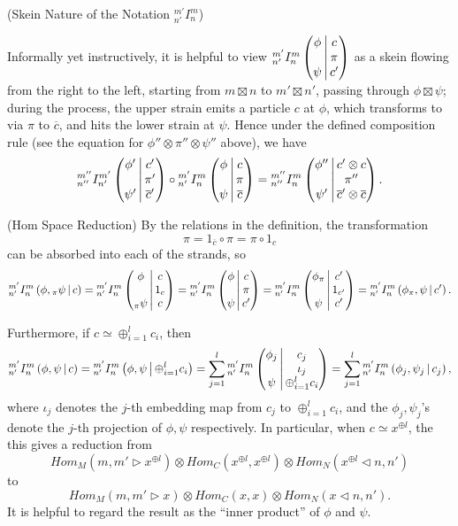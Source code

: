 \begin{remark}\label{remark/skein-nature-of-the-notation-I} (Skein Nature of the Notation ${}^{m'}_{n'}I^{m}_{n}$)

  \noindent Informally yet instructively, it is helpful to view
  ${}^{m'}_{n'} I^{m}_{n} \left( \begin{matrix} \phi \\ {}\\ \psi \end{matrix} \,\middle|\, \begin{matrix} c \\ \pi \\ c' \end{matrix} \right)$ as a skein flowing from the right to
  the left, starting from $m \boxtimes n$ to $m' \boxtimes n'$, passing through $\phi \boxtimes \psi$;
  during the process, the upper strain emits a particle $c$ at $\phi$, which
  transforms to via $\pi$ to $\overline{c}$, and hits the lower strain at
  $\psi$. Hence under the defined composition rule (see the equation for
  $\phi'' \otimes \pi'' \otimes \psi''$ above), we have
  \[
    {}^{m''}_{n''} I^{m'}_{n'} \left( \begin{matrix} \phi' \\ {}\\ \psi' \end{matrix} \,\middle|\, \begin{matrix} c' \\ \pi' \\ \overline{c}' \end{matrix} \right) \circ
    {}^{m'}_{n'} I^{m}_{n} \left( \begin{matrix} \phi \\ {}\\ \psi \end{matrix} \,\middle|\, \begin{matrix} c \\ \pi \\ \overline{c} \end{matrix} \right) =
    {}^{m''}_{n''} I^{m}_{n} \left( \begin{matrix} \phi'' \\ {}\\ \psi' \end{matrix} \,\middle|\, \begin{matrix} c' \otimes c \\ \pi'' \\ \overline{c}' \otimes \overline{c} \end{matrix} \right).
  \]
\end{remark}

\begin{remark}\label{remark/hom-space-reduction} (Hom Space Reduction)
  \noindent By the relations in the definition, the transformation
  \[
    \pi = 1_{\overline{c}} \circ \pi = \pi \circ 1_{c}
  \]
  can be absorbed into each of the strands, so
  \[
    {}^{m'}_{n'} I^{m}_{n} \left( \phi, {}_{\pi}\psi \,\middle|\, c \right) =
    {}^{m'}_{n'} I^{m}_{n} \left( \begin{matrix} \phi \\ {}\\ {}_{\pi}\psi \end{matrix} \,\middle|\, \begin{matrix} c \\ 1_{c} \\ c \end{matrix} \right) =
    {}^{m'}_{n'} I^{m}_{n} \left( \begin{matrix} \phi \\ {}\\ \psi \end{matrix} \,\middle|\, \begin{matrix} c \\ \pi \\ c' \end{matrix} \right) =
    {}^{m'}_{n'} I^{m}_{n} \left( \begin{matrix} \phi_{\pi} \\ {}\\ \psi \end{matrix} \,\middle|\, \begin{matrix} c' \\ 1_{c'} \\ c' \end{matrix} \right) =
    {}^{m'}_{n'} I^{m}_{n} \left( \phi_{\pi}, \psi \,\middle|\, c' \right).
  \]

  \noindent Furthermore, if $c \simeq \oplus_{i=1}^{l} c_{i}$, then
  \[
    {}^{m'}_{n'} I^{m}_{n} \left( \phi, \psi \,\middle|\, c \right) = {}^{m'}_{n'} I^{m}_{n} \left( \phi, \psi \,\middle|\, \oplus_{i=1}^{l} c_{i} \right) = \sum_{j=1}^{l} {}^{m'}_{n'} I^{m}_{n} \left( \begin{matrix} \phi_{j} \\ {}\\ \psi \end{matrix} \,\middle|\, \begin{matrix} c_{j} \\ \iota_{j} \\ \oplus_{i=1}^{l} c_{i} \end{matrix} \right) =
    \sum_{j=1}^{l}{}^{m'}_{n'} I^{m}_{n} \left( \phi_{j}, \psi_{j} \,\middle|\, c_{j} \right),
  \]
  where $\iota_{j}$ denotes the $j$-th embedding map from $c_{j}$ to
  $\oplus_{i=1}^{l}c_{i}$, and the $\phi_{j}, \psi_{j}$'s denote the $j$-th
  projection of $\phi, \psi$ respectively. In particular, when
  $c \simeq x^{\oplus l}$, the this gives a reduction from
  \[
    Hom_{M}(m, m' \rhd x^{\oplus l}) \otimes Hom_{C}(x^{\oplus l}, x^{\oplus l}) \otimes Hom_{N} (x^{\oplus l} \lhd n, n')
  \]
  to
  \[
    Hom_{M}(m, m' \rhd x) \otimes Hom_{C}(x, x) \otimes Hom_{N} (x \lhd n, n').
  \]
  It is helpful to regard the result as the ``inner product'' of $\phi$ and $\psi$.
\end{remark}

